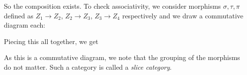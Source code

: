 \documentclass{report}
\begin{document}
\begin{examples}
\begin{example}[\label{exm:1.3.5}]
\begin{center}
\begin{tikzcd}
                \end{tikzcd}
            \end{center}
            So the composition exists. To check associativity, we consider morphisms $\sigma, \tau, \pi$ defined as $Z_{1} \rightarrow Z_{2}$, $Z_{2} \rightarrow Z_{3}$, $Z_{3} \rightarrow Z_{4}$ respectively and we draw a commutative diagram each:
            \begin{center}
            \end{center}
            Piecing this all together, we get
            \begin{center}
            \end{center}
            As this is a commutative diagram, we note that the grouping of the morphisms do not matter. Such a category is called a \textit{slice category}.
    \end{example}


\end{examples}
\end{document}
